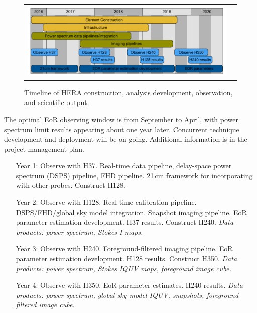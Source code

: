 \documentclass[preprint,11pt]{aastex}
\begin{document}
\begin{figure}[h]
	\vspace{-7pt}
	\begin{tabular}{ll}
	\begin{minipage}{5in}
		\includegraphics[width=4.9in]{plots/timeline_short.pdf}
		\end{minipage} & \hspace{-.15in}
	\begin{minipage}{1.35in}
\captionsetup{justification=raggedright,
singlelinecheck=false
}
	\caption{Timeline of HERA construction, analysis development, observation, and scientific output.}
	\label{fig:timeline}
	\end{minipage}
	\end{tabular}
	\vspace{-8pt}
\end{figure}



The optimal EoR observing window is from September to April, with power spectrum limit results appearing about one year later.  Concurrent technique development and deployment will be on-going. Additional information is in the project management plan.
\begin{itemize}[leftmargin=0.7in]
\item[Year 1:] Observe with H37.  Real-time data pipeline, delay-space power spectrum (DSPS) pipeline, FHD pipeline.  21\,cm framework for incorporating with other probes. Construct H128.
\item[Year 2:] Observe with H128.  Real-time calibration pipeline.  DSPS/FHD/global sky model integration. Snapshot imaging pipeline.  EoR parameter estimation development.  H37 results.  Construct H240.  {\em Data products:  power spectrum, Stokes I maps.}
\item[Year 3:] Observe with H240.  Foreground-filtered imaging pipeline.  EoR parameter estimation development.   H128 results. Construct H350.  {\em Data products:  power spectrum, Stokes IQUV maps, foreground image cube.}
\item[Year 4:] Observe with H350.  EoR parameter estimates.  H240 results.  {\em Data products:  power spectrum, global sky model IQUV, snapshots, foreground-filtered image cube.}
\end{itemize}
\end{document}
